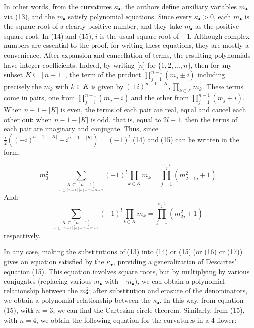 \documentclass[12pt]{article}
\theoremstyle{définition}
\theoremstyle{remark}
\theoremstyle{plain}
\theoremstyle{plain}
\begin{document}
In other words, from the curvatures $\kappa_\bullet$, the authors define auxiliary variables $m_\bullet$ via (13), and the $m_\bullet$ satisfy polynomial equations. Since every $\kappa_\bullet > 0$, each $m_\bullet$ is the square root of a clearly positive number, and they take $m_\bullet$ as the positive square root.
In (14) and (15), $i$ is the usual square root of $-1$. Although complex numbers are essential to the proof, for writing these equations, they are mostly a convenience. After expansion and cancellation of terms, the resulting polynomials have integer coefficients. Indeed, by writing [$n$] for $\{1,2,...,n\}$, then for any subset $K \subseteq [n - 1]$, the term of the product $\prod^{n-1}_{j=1}(m_j\pm i)$ including precisely the $m_k$ with $k \in K$ is given by $(\pm i)^{n-1-|K}, \prod_{k \in K} m_k$. These terms come in pairs, one from $\prod_{j=1}^{n-1} (m_j-i)$ and the other from $\prod_{j=1}^{n-1} (m_j+i)$. When $n-1-|K|$ is even, the terms of each pair are real, equal and cancel each other out; when $n-1-|K|$ is
odd, that is, equal to $2l+1$, then the terms of each pair are imaginary and conjugate. Thus, since $\frac{i}{2}((-i)^{n-1-|K|}-i^{n-1-|K|}) = (-1)^l$ (14) and (15) can be written in the form;

\begin{equation}
m_0^2 = \sum\limits_{\underset{K \subseteq [n-1] |K| = n-2l-2}{K \subseteq [n-1]}} (-1)^l \prod_{k \in K} m_k = \prod_{j =1}^{\frac{n-1}{2}} (m_{2-1j}^2 +1)
\end{equation}
And:
\begin{equation}
 \sum\limits_{\underset{K \subseteq [n-1] |K| = n-2l-2}{K \subseteq [n-1]}} (-1)^l \prod_{k \in K} m_k = \prod_{j =1}^{\frac{n-1}{2}} (m_{2j}^2 +1)
\end{equation}
respectively.

In any case, making the substitutions of (13) into (14) or (15) (or (16) or (17)) gives an equation satisfied by the $\kappa_\bullet$,
providing a generalization of Descartes' equation (15). This equation involves square roots, but by multiplying by various conjugates (replacing various $m_\bullet$ with $-m_\bullet$), we can obtain a polynomial relationship between the $m^2_\bullet$; after substitution and erasure of the denominators, we obtain a polynomial relationship between the $\kappa_\bullet$.
In this way, from equation (15), with $n = 3$, we can find the Cartesian circle theorem. Similarly, from (15), with $n = 4$, we obtain the following equation for the curvatures in a 4-flower:
\end{document}
